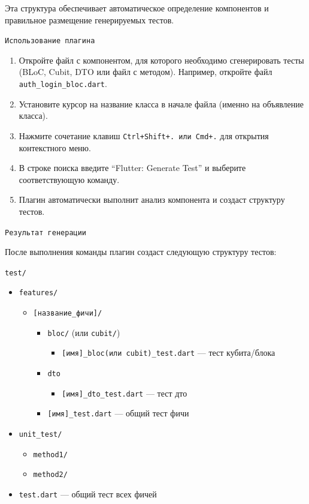 \documentclass[14pt, russian]{scrartcl}
\newcommand{\enq}[1]{\enquote{#1}}
\begin{document}
Эта структура обеспечивает автоматическое определение компонентов и правильное размещение генерируемых тестов.

\texttt{Использование плагина}

\begin{enumerate}
    \item Откройте файл с компонентом, для которого необходимо сгенерировать тесты (BLoC, Cubit, DTO или файл с методом). Например, откройте файл \texttt{auth\_login\_bloc.dart}.
    \item Установите курсор на название класса в начале файла (именно на объявление класса).
    \item Нажмите сочетание клавиш \texttt{Ctrl+Shift+. или Cmd+.} для открытия контекстного меню.
    \item В строке поиска введите \enq{Flutter: Generate Test} и выберите соответствующую команду.
    \item Плагин автоматически выполнит анализ компонента и создаст структуру тестов.
\end{enumerate}

\texttt{Результат генерации}

После выполнения команды плагин создаст следующую структуру тестов:

\texttt{test/}
\begin{itemize}
    \item \texttt{features/}
    \begin{itemize}
        \item \texttt{[название\_фичи]/}
        \begin{itemize}
            \item \texttt{bloc/} (или \texttt{cubit/})
            \begin{itemize}
                \item \texttt{[имя]\_bloc(или cubit)\_test.dart} --- тест кубита/блока
            \end{itemize}
            \item \texttt{dto}
            \begin{itemize}
                \item \texttt{[имя]\_dto\_test.dart} --- тест дто
            \end{itemize}
            \item \texttt{[имя]\_test.dart} --- общий тест фичи
        \end{itemize}
    \end{itemize}
    \item \texttt{unit\_test/}
    \begin{itemize}
        \item \texttt{method1/}
        \item \texttt{method2/}
    \end{itemize}
    \item \texttt{test.dart} --- общий тест всех фичей
\end{itemize}
\end{document}
